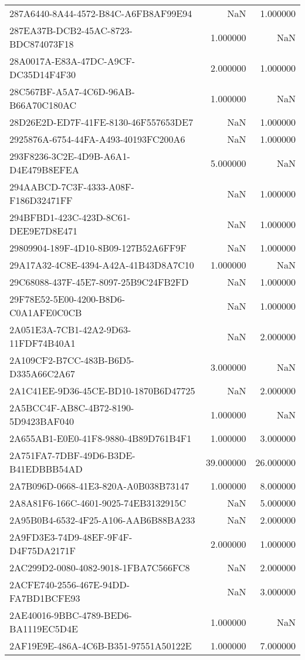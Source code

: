 \begin{tabular}{lrr}
287A6440-8A44-4572-B84C-A6FB8AF99E94 & NaN & 1.000000 \\
287EA37B-DCB2-45AC-8723-BDC874073F18 & 1.000000 & NaN \\
28A0017A-E83A-47DC-A9CF-DC35D14F4F30 & 2.000000 & 1.000000 \\
28C567BF-A5A7-4C6D-96AB-B66A70C180AC & 1.000000 & NaN \\
28D26E2D-ED7F-41FE-8130-46F557653DE7 & NaN & 1.000000 \\
2925876A-6754-44FA-A493-40193FC200A6 & NaN & 1.000000 \\
293F8236-3C2E-4D9B-A6A1-D4E479B8EFEA & 5.000000 & NaN \\
294AABCD-7C3F-4333-A08F-F186D32471FF & NaN & 1.000000 \\
294BFBD1-423C-423D-8C61-DEE9E7D8E471 & NaN & 1.000000 \\
29809904-189F-4D10-8B09-127B52A6FF9F & NaN & 1.000000 \\
29A17A32-4C8E-4394-A42A-41B43D8A7C10 & 1.000000 & NaN \\
29C68088-437F-45E7-8097-25B9C24FB2FD & NaN & 1.000000 \\
29F78E52-5E00-4200-B8D6-C0A1AFE0C0CB & NaN & 1.000000 \\
2A051E3A-7CB1-42A2-9D63-11FDF74B40A1 & NaN & 2.000000 \\
2A109CF2-B7CC-483B-B6D5-D335A66C2A67 & 3.000000 & NaN \\
2A1C41EE-9D36-45CE-BD10-1870B6D47725 & NaN & 2.000000 \\
2A5BCC4F-AB8C-4B72-8190-5D9423BAF040 & 1.000000 & NaN \\
2A655AB1-E0E0-41F8-9880-4B89D761B4F1 & 1.000000 & 3.000000 \\
2A751FA7-7DBF-49D6-B3DE-B41EDBBB54AD & 39.000000 & 26.000000 \\
2A7B096D-0668-41E3-820A-A0B038B73147 & 1.000000 & 8.000000 \\
2A8A81F6-166C-4601-9025-74EB3132915C & NaN & 5.000000 \\
2A95B0B4-6532-4F25-A106-AAB6B88BA233 & NaN & 2.000000 \\
2A9FD3E3-74D9-48EF-9F4F-D4F75DA2171F & 2.000000 & 1.000000 \\
2AC299D2-0080-4082-9018-1FBA7C566FC8 & NaN & 2.000000 \\
2ACFE740-2556-467E-94DD-FA7BD1BCFE93 & NaN & 3.000000 \\
2AE40016-9BBC-4789-BED6-BA1119EC5D4E & 1.000000 & NaN \\
2AF19E9E-486A-4C6B-B351-97551A50122E & 1.000000 & 7.000000 \\

\end{tabular}
